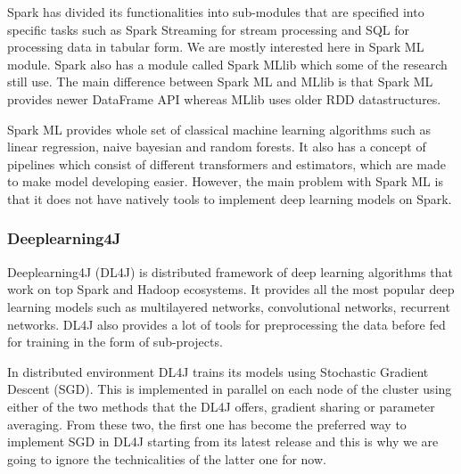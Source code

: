 Spark has divided its functionalities into sub-modules that are specified into specific tasks such as Spark Streaming for stream processing and SQL for processing data in tabular form.
We are mostly interested here in Spark ML module.
Spark also has a module called Spark MLlib which some of the research still use.
The main difference between Spark ML and MLlib is that Spark ML provides newer DataFrame API whereas MLlib uses older RDD datastructures.\cite{amirghodsi}


Spark ML provides whole set of classical machine learning algorithms such as linear regression, naive bayesian and random forests.
It also has a concept of pipelines which consist of different transformers and estimators, which are made to make model developing easier.
However, the main problem with Spark ML is that it does not have natively tools to implement deep learning models on Spark.

\subsubsection{Deeplearning4J}

Deeplearning4J (DL4J) is distributed framework of deep learning algorithms that work on top Spark and Hadoop ecosystems.
It provides all the most popular deep learning models such as multilayered networks, convolutional networks, recurrent networks.
DL4J also provides a lot of tools for preprocessing the data before fed for training in the form of sub-projects. \cite{dl4j}

In distributed environment DL4J trains its models using Stochastic Gradient Descent (SGD).
This is implemented in parallel on each node of the cluster using either of the two methods that the DL4J offers, gradient sharing or parameter averaging.
From these two, the first one has become the preferred way to implement SGD in DL4J starting from its latest release and this is why we are going to ignore the technicalities of the latter one for now.

